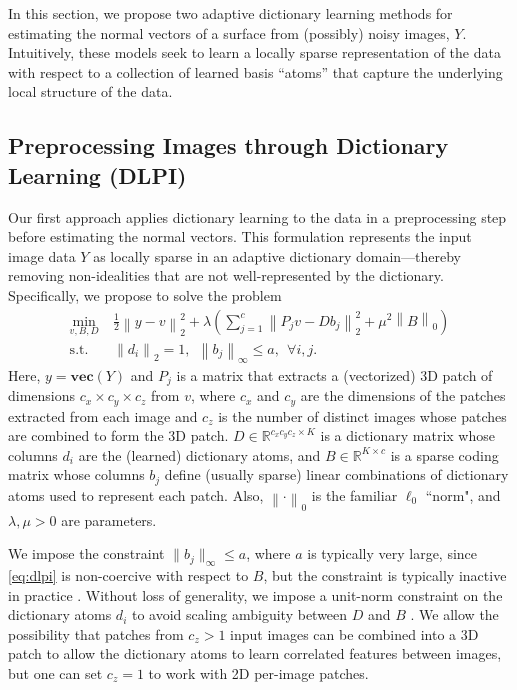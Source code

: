 
In this section, we propose two adaptive dictionary learning methods for estimating the normal vectors of a surface from (possibly) noisy images, $Y$. Intuitively, these models seek to learn a locally sparse representation of the data with respect to a collection of learned basis ``atoms'' that capture the underlying local structure of the data.

\subsection{Preprocessing Images through Dictionary Learning (DLPI)}
Our first approach applies dictionary learning to the data in a preprocessing step before estimating the normal vectors. This formulation represents the input image data $Y$ as locally sparse in an adaptive dictionary domain---thereby removing non-idealities that are not well-represented by the dictionary. Specifically, we propose to solve the problem
\begin{align} \label{eq:dlpi}
\min_{v,B,D} & ~ \frac{1}{2} \left \| y -  v \right \|_2^2 + \lambda \left(\textstyle\sum_{j=1}^c \left \| P_j v  - D b_j \right \|_2^2 +  \mu^2 \left \| B \right \|_0 \right) \nonumber \\
\text{s.t.} & ~ \left \| d_i \right \|_2 = 1, \ \ \left \| b_j \right \|_{\infty} \leq a, ~~ \forall i,j.
\end{align}
Here, $y = \textbf{vec}(Y)$ and $P_j$ is a matrix that extracts a (vectorized) 3D patch of dimensions $c_x \times c_y \times c_z$ from $v$, where $c_x$ and $c_y$ are the dimensions of the patches extracted from each image and $c_z$ is the number of distinct images whose patches are combined to form the 3D patch. $D \in \mathbb{R}^{c_x c_y c_z \times K}$ is a dictionary matrix whose columns $d_i$ are the (learned) dictionary atoms, and $B \in \mathbb{R}^{K \times c}$ is a sparse coding matrix whose columns $b_j$ define (usually sparse) linear combinations of dictionary atoms used to represent each patch. Also, $\left \|\cdot\right \|_0$ is the familiar $\ell_0$ ``norm", and $\lambda,\mu > 0$ are parameters. 

We impose the constraint $\|b_j\|_{\infty} \leq a$, where $a$ is typically very large, since \eqref{eq:dlpi} is non-coercive with respect to $B$, but the constraint is typically inactive in practice \cite{sairajfes2}. Without loss of generality, we impose a unit-norm constraint on the dictionary atoms $d_i$ to avoid scaling ambiguity between $D$ and $B$ \cite{kar}.
We allow the possibility that patches from $c_z > 1$ input images can be combined into a 3D patch to allow the dictionary atoms to learn correlated features between images, but one can set $c_z = 1$ to work with 2D per-image patches.

